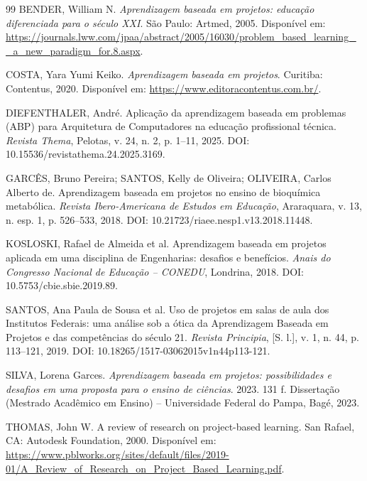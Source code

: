 \begin{thebibliography}{99}
BENDER, William N. \textit{Aprendizagem baseada em projetos: educação diferenciada para o século XXI}. São Paulo: Artmed, 2005. Disponível em: \url{https://journals.lww.com/jpaa/abstract/2005/16030/problem_based_learning__a_new_paradigm_for.8.aspx}.

COSTA, Yara Yumi Keiko. \textit{Aprendizagem baseada em projetos}. Curitiba: Contentus, 2020. Disponível em: \url{https://www.editoracontentus.com.br/}.

DIEFENTHALER, André. Aplicação da aprendizagem baseada em problemas (ABP) para Arquitetura de Computadores na educação profissional técnica. \textit{Revista Thema}, Pelotas, v. 24, n. 2, p. 1--11, 2025. DOI: 10.15536/revistathema.24.2025.3169.

GARCÊS, Bruno Pereira; SANTOS, Kelly de Oliveira; OLIVEIRA, Carlos Alberto de. Aprendizagem baseada em projetos no ensino de bioquímica metabólica. \textit{Revista Ibero-Americana de Estudos em Educação}, Araraquara, v. 13, n. esp. 1, p. 526--533, 2018. DOI: 10.21723/riaee.nesp1.v13.2018.11448.

KOSLOSKI, Rafael de Almeida et al. Aprendizagem baseada em projetos aplicada em uma disciplina de Engenharias: desafios e benefícios. \textit{Anais do Congresso Nacional de Educação -- CONEDU}, Londrina, 2018. DOI: 10.5753/cbie.sbie.2019.89.

SANTOS, Ana Paula de Sousa et al. Uso de projetos em salas de aula dos Institutos Federais: uma análise sob a ótica da Aprendizagem Baseada em Projetos e das competências do século 21. \textit{Revista Principia}, [S. l.], v. 1, n. 44, p. 113--121, 2019. DOI: 10.18265/1517-03062015v1n44p113-121.

SILVA, Lorena Garces. \textit{Aprendizagem baseada em projetos: possibilidades e desafios em uma proposta para o ensino de ciências}. 2023. 131 f. Dissertação (Mestrado Acadêmico em Ensino) -- Universidade Federal do Pampa, Bagé, 2023.

THOMAS, John W. A review of research on project-based learning. San Rafael, CA: Autodesk Foundation, 2000. Disponível em: \url{https://www.pblworks.org/sites/default/files/2019-01/A_Review_of_Research_on_Project_Based_Learning.pdf}.



\end{thebibliography}
